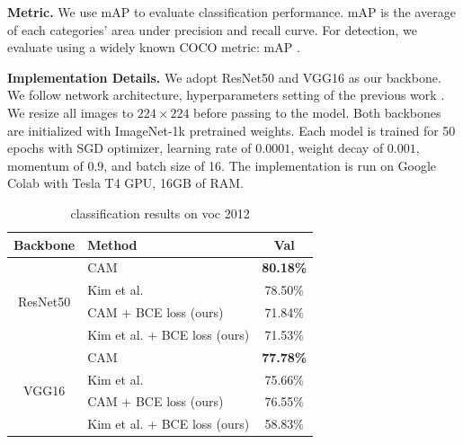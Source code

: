 \documentclass[conference]{IEEEtran}
\begin{document}
\textbf{Metric.} We use mAP to evaluate classification performance. mAP is the average of each categories' area under precision and recall curve. For detection, we evaluate using a widely known COCO metric: mAP \cite{lin2015microsoft}.

\textbf{Implementation Details.} We adopt ResNet50 \cite{7780459} and VGG16 \cite{simonyan2015deep} as our backbone. We follow network architecture, hyperparameters setting of the previous work \cite{kim2022bridging}. We resize all images to $224\times224$ before passing to the model. Both backbones are initialized with ImageNet-1k \cite{ILSVRC15} pretrained weights. Each model is trained for 50 epochs with SGD optimizer, learning rate of $0.0001$, weight decay of $0.001$, momentum of $0.9$, and batch size of 16. The implementation is run on Google Colab with Tesla T4 GPU, 16GB of RAM.


\begin{table}[t]
    \centering
    \caption{classification results on voc 2012}
    \label{tab:classification_map_voc_2012}
    \begin{tabular}{|c|l|c|}
        \hline
        Backbone                     & Method                                              & Val                             \\
        \hline
        \multirow[c]{4}{*}{ResNet50} & CAM\cite{zhou2015cnnlocalization}                   & \color{red} \bfseries{80.18\%}  \\
                                     & Kim et al. \cite{kim2022bridging}                   & 78.50\%                         \\
                                     & CAM\cite{zhou2015cnnlocalization} + BCE loss (ours) & 71.84\%                         \\
                                     & Kim et al. \cite{kim2022bridging} + BCE loss (ours) & 71.53\%                         \\
        \hline
        \multirow[c]{4}{*}{VGG16}    & CAM\cite{zhou2015cnnlocalization}                   & \color{blue} \bfseries{77.78\%} \\
                                     & Kim et al. \cite{kim2022bridging}                   & 75.66\%                         \\
                                     & CAM\cite{zhou2015cnnlocalization} + BCE loss (ours) & 76.55\%                         \\
                                     & Kim et al. \cite{kim2022bridging} + BCE loss (ours) & 58.83\%                         \\
        \hline
    \end{tabular}
\end{table}
\end{document}
